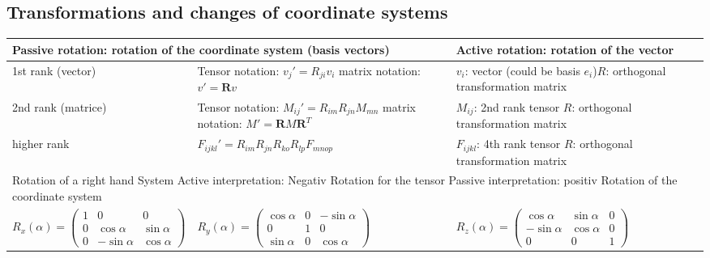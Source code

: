 	\subsection{Transformations and changes of coordinate systems}
	
	\begin{tabularx}{\columnwidth}{p{4.8cm}Xp{4.8cm}}	
		\hline 
		\multicolumn{2}{p{8cm}}{\textbf{Passive rotation}: rotation of the coordinate system (basis vectors)} & \textbf{Active rotation}: rotation of the vector  \\
		\hline
		1st rank (vector) & Tensor notation: $v_j' = R_{ji}v_i$  \newline matrix notation: $v' =  \textbf{R}v$ & $v_i$: vector (could be basis $e_i$)\newline $R$: orthogonal transformation matrix\\
		\hline 
		2nd rank (matrice) & Tensor notation: $M_{ij}' = R_{im}R_{jn}M_{mn}$  \newline matrix notation: $M' =  \textbf{R}M\textbf{R}^T$ & $M_{ij}$: 2nd rank tensor \newline $R$: orthogonal transformation matrix\\
		\hline 
		higher rank & $F_{ijkl}' = R_{im}R_{jn}R_{ko}R_{lp}F_{mnop}$  \newline & $F_{ijkl}$: 4th rank tensor \newline $R$: orthogonal transformation matrix\\					
		\hline
		\multicolumn{3}{p{\columnwidth}}{Rotation of a right hand System\newline 
		Active interpretation: Negativ Rotation for the tensor \newline
		Passive interpretation: positiv Rotation of the coordinate system}\\
		$R_x(\alpha) = \begin{pmatrix} 
		1 &   0         & 0           \\
		0 & \cos \alpha & \sin \alpha \\
		0 & -\sin \alpha &  \cos \alpha
		\end{pmatrix} $ &
		$R_y(\alpha) = \begin{pmatrix} 
		\cos \alpha  & 0 & -\sin \alpha \\
		0         & 1 &  0          \\
		\sin \alpha & 0 & \cos \alpha
		\end{pmatrix} $ &
		$R_z(\alpha) = \begin{pmatrix} 
		\cos \alpha & \sin \alpha & 0 \\
		-\sin \alpha &  \cos \alpha & 0 \\            
		0        &  0           & 1
		\end{pmatrix}$\\
					
	\hline 
	\end{tabularx}
	

